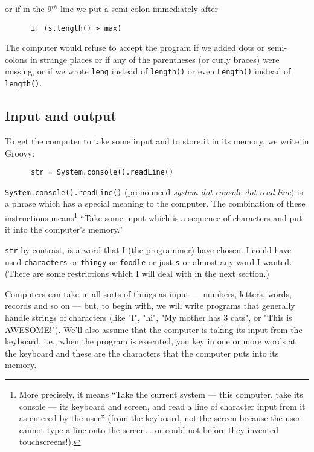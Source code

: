 or if in the 9$^{th}$ line we put a semi-colon immediately after 

\begin{Verbatim}
      if (s.length() > max)
\end{Verbatim}

The computer would refuse to accept the program if we added dots or semi-colons 
in strange places
or if any of the parentheses (or curly braces) were missing, or if we wrote
\verb!leng! instead of \verb!length()! or even \verb!Length()! instead of \verb!length()!.

% 

\subsection{Input and output}

To get the computer to take some input and to store it
in its memory, we write in Groovy:

\begin{Verbatim}
      str = System.console().readLine()
\end{Verbatim}

\verb!System.console().readLine()! (pronounced \emph{system dot
  console dot read line}) is a phrase which has a special meaning to
the computer. The combination of these instructions
means\footnote{More precisely, it means ``Take the current system
  --- this computer, take its console --- its keyboard and screen,
and read a line of character input from it as entered by the user'' (from the keyboard,
not the screen because the user cannot type a line onto the screen... or
could not before they invented touchscreens!).}
``Take some input which is a sequence of characters and put it into the computer's memory.''

\verb!str! by contrast, is a word that I (the programmer) have chosen.
I could have used \verb!characters! or \verb!thingy! or \verb!foodle!
or just \verb!s! or almost any word I wanted. (There are some
restrictions which I will deal with in the next section.)  

Computers can take in all sorts of things as input --- numbers,
letters, words, records and so on --- but, to begin with, we will
write programs that generally handle strings of characters (like
"I", "hi", "My mother has 3 cats", or "This is AWESOME!").
We'll also assume that the computer is taking its input from the
keyboard, i.e., when the program is executed, you key in one or more
words at the keyboard and these are the characters that the computer 
puts into its memory.

